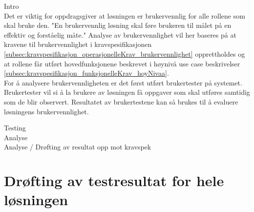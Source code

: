 Intro\\
Det er viktig for oppdragsgiver at løsningen er brukervennlig for alle rollene som skal bruke den. "En brukervennlig løsning skal føre brukeren til målet på en effektiv og forståelig måte." \cite{Brukervennlighet} Analyse av brukervennlighet vil her baseres på at kravene til brukervennlighet i kravspesifikasjonen \ref{subsec:kravspesifikasjon_operasjonelleKrav_brukervennlighet} opprettholdes og at rollene får utført hovedfunksjonene beskrevet i høynivå use case beskrivelser \ref{subsec:kravspesifikasjon_funksjonelleKrav_hoyNivaa}.  
\\
For å analysere brukervennligheten er det først utført brukertester på systemet. Brukertester vil si å la brukere av løsningen få oppgaver som skal utføres samtidig som de blir observert. Resultatet av brukertestene kan så brukes til å evaluere løsningens brukervennlighet. \cite{PraktiskBrukertesting}


Testing \\
Analyse \\
Analyse / Drøfting av resultat opp mot kravspek \\

\section{Drøfting av testresultat for hele løsningen}
\label{sec:testing_drøftingAvResultat}
